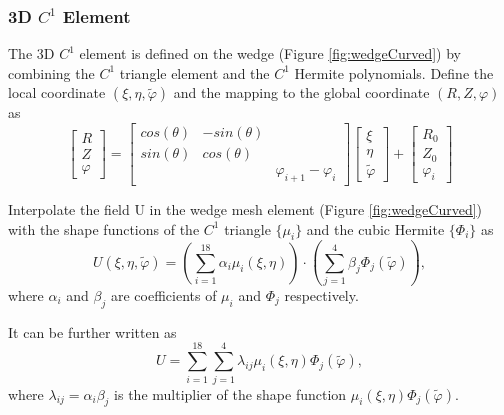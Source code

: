 \documentclass[11pt]{article}  %
\begin{document}
\subsubsection{3D $C^1$ Element} 
The 3D $C^1$ element is defined on the wedge (Figure \ref{fig:wedgeCurved}) by combining the $C^1$ triangle element and the $C^1$ Hermite polynomials. 
Define the local coordinate $(\xi,\eta,\tilde{\varphi})$  and the mapping to the global coordinate $(R,Z,\varphi)$ as
\begin{equation} \label{mapping}
\left[ \begin{array}{c}
          R\\
          Z \\
          \varphi
        \end{array}
 \right]=\left[
        \begin{array}{ccc}
          cos(\theta) & -sin(\theta) & \\
          sin(\theta) & cos(\theta) & \\
          & &  \varphi_{i+1}-\varphi_{i}
        \end{array}
        \right] \left[
        \begin{array}{c}
          \xi \\
          \eta \\
          \tilde{\varphi}
        \end{array}  \right] +\left[\begin{array}{c}
          R_0\\
          Z_0\\
          \varphi_i
        \end{array}
        \right]
\end{equation}

Interpolate  the field U in the wedge mesh element (Figure \ref{fig:wedgeCurved}) with the shape functions of the $C^1$ triangle $\{\mu_i\}$ and the cubic Hermite $\{\Phi_i\}$  as
\begin{equation}
U(\xi,\eta,\tilde{\varphi})=\left(\sum_{i=1}^{18} \alpha_i \mu_i(\xi,\eta) \right) \cdot \left( \sum_{j=1}^{4} \beta_j \Phi_j (\tilde{\varphi}) \right),
\end{equation}
where $\alpha_i$ and $\beta_j$ are coefficients of  $\mu_i$ and $\Phi_j$ respectively.

It can be further written as
\begin{equation}
U=\sum_{i=1}^{18} \sum_{j=1}^{4} \lambda_{ij} \mu_i(\xi,\eta)\Phi_j(\tilde{\varphi}),
\end{equation}
where $\lambda_{ij}=\alpha_i\beta_j$ is the multiplier of the shape function $\mu_i(\xi,\eta)\Phi_j(\tilde{\varphi})$.
\end{document}
